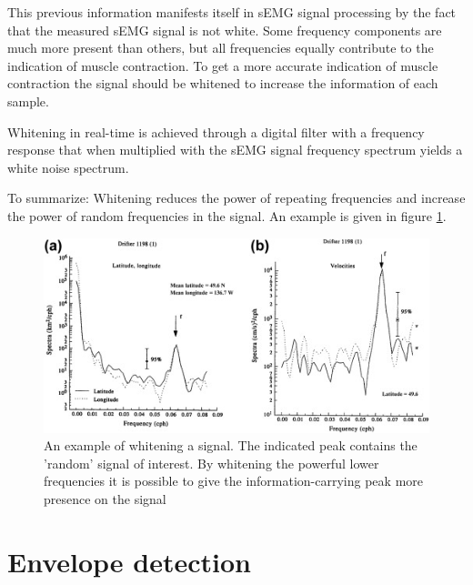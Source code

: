 This previous information manifests itself in sEMG signal processing by the fact that the measured sEMG signal is not white. Some frequency components are much more present than others, but all frequencies equally contribute to the indication of muscle contraction. To get a more accurate indication of muscle contraction the signal should be whitened to increase the information of each sample.

Whitening in real-time is achieved through a digital filter with a frequency response that when multiplied with the sEMG signal frequency spectrum yields a white noise spectrum.

To summarize: Whitening reduces the power of repeating frequencies and increase the power of random frequencies in the signal. An example is given in figure \ref{fig:whitening_example}.

\begin{figure}[h!t]
	\begin{center}
		\includegraphics[width=1.0\columnwidth]{images/prewhitening_example.jpg}
	\end{center}
	\caption{An example of whitening a signal. The indicated peak contains the 'random' signal of interest. By whitening the powerful lower frequencies it is possible to give the information-carrying peak more presence on the signal \cite{time_series_analysis_methods}}
	\label{fig:whitening_example}
\end{figure}


\section{Envelope detection}

